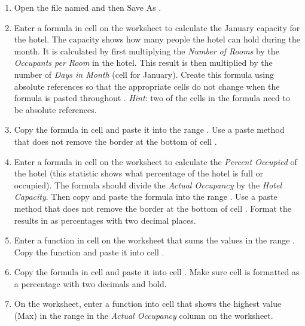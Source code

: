 \begin{enumerate}
	\item Open the file named  and then Save As .
	
	\item Enter a formula in cell  on the  worksheet to calculate the January capacity for the hotel. The capacity shows how many people the hotel can hold during the month. It is calculated by first multiplying the \textit{Number of Rooms} by the \textit{Occupants per Room} in the hotel. This result is then multiplied by the number of \textit{Days in Month} (cell  for January). Create this formula using absolute references so that the appropriate cells do not change when the formula is pasted throughout . \textit{Hint}: two of the cells in the formula need to be absolute references.
	
	\item Copy the formula in cell  and paste it into the range . Use a paste method that does not remove the border at the bottom of cell .
	
	\item Enter a formula in cell  on the  worksheet to calculate the \textit{Percent Occupied} of the hotel (this statistic shows what percentage of the hotel is full or occupied). The formula should divide the \textit{Actual Occupancy} by the \textit{Hotel Capacity}. Then copy and paste the formula into the range . Use a paste method that does not remove the border at the bottom of cell . Format the results in  as percentages with two decimal places.
	
	\item Enter a function in cell  on the  worksheet that sums the values in the range . Copy the function and paste it into cell .
	
	\item Copy the formula in cell  and paste it into cell . Make sure cell  is formatted as a percentage with two decimals and bold.
	
	\item On the  worksheet, enter a function into cell  that shows the highest value (Max) in the range  in the \textit{Actual Occupancy} column on the  worksheet.
	

\end{enumerate}
